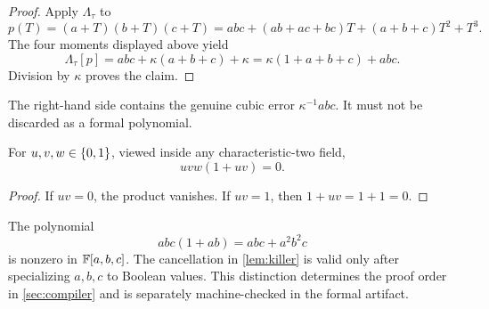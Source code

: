 \begin{proof}
Apply \(\Lambda_\tau\) to
\[
 p(T)=(a+T)(b+T)(c+T)
 =abc+(ab+ac+bc)T+(a+b+c)T^2+T^3.
\]
The four moments displayed above yield
\[
 \Lambda_\tau[p]=abc+\kappa(a+b+c)+\kappa
 =\kappa(1+a+b+c)+abc.
\]
Division by \(\kappa\) proves the claim.
\end{proof}

The right-hand side contains the genuine cubic error \(\kappa^{-1}abc\).  It must not be
discarded as a formal polynomial.

\begin{lemma}\label{lem:killer}
For \(u,v,w\in\{0,1\}\), viewed inside any characteristic-two field,
\[
  uvw(1+uv)=0.
\]
\end{lemma}

\begin{proof}
If \(uv=0\), the product vanishes.  If \(uv=1\), then \(1+uv=1+1=0\).
\end{proof}

\begin{remark}\label{rem:firewall}
The polynomial
\[
 abc(1+ab)=abc+a^2b^2c
\]
is nonzero in \(\mathbb{F}[a,b,c]\).  The cancellation in \cref{lem:killer} is valid only after
specializing \(a,b,c\) to Boolean values.  This distinction determines the proof order in
\cref{sec:compiler} and is separately machine-checked in the formal artifact.
\end{remark}
